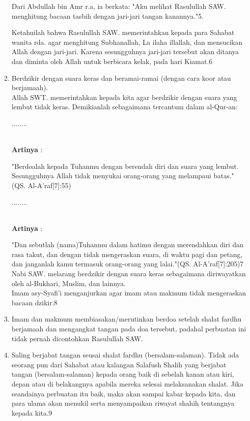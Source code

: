\documentclass[a4paper,12pt]{article}
\begin{document}
\begin{enumerate}
\par
\indent
Dari Abdullah bin Amr r.a, ia berkata: "Aku melihat Rasulullah SAW. menghitung bacaan tasbih dengan jari-jari tangan kanannya."5.\\
\par
\indent
Ketahuilah bahwa Rasulullah SAW. memerintahkan kepada para Sahabat wanita rda. agar menghitung Subhanallah, La ilaha illallah, dan mensucikan Allah dengan jari-jari. Karena sesungguhnya jari-jari tersebut akan ditanya dan diminta oleh Allah untuk berbicara kelak, pada hari Kiamat.6\\
\item Berdzikir dengan suara keras dan beramai-ramai (dengan cara koor atau berjamaah).\\
Allah SWT. memerintahkan kepada kita agar berdzikir dengan suara yang lembut tidak keras. Demikianlah sebagaimana tercantum dalam al-Qur-an:
\begin{arabtext}
\noindent
........ \\ \\
\end{arabtext}
\noindent
\textbf{Artinya} :
\par
\indent
"Berdoalah kepada Tuhanmu dengan berendah diri dan suara yang lembut. Sesungguhnya Allah tidak menyukai orang-orang yang melampaui batas."(QS. Al-A'raf[7]:55)\\
\begin{arabtext}
\noindent
........ \\ \\
\end{arabtext}
\noindent
\textbf{Artinya} :
\par
\indent
"Dan sebutlah (nama)Tuhanmu dalam hatimu dengan merendahkan diri dan rasa takut, dan dengan tidak mengeraskan suara, di waktu pagi dan petang, dan janganlah kamu termasuk orang-orang yang lalai."(QS. Al-A'raf[7]:205)7\\
\indent
Nabi SAW. melarang berdzikir dengan suara keras sebagaimana diriwayatkan oleh al-Bukhari, Muslim, dan lainnya.\\
\indent
Imam asy-Syafi'i menganjurkan agar imam atau makmum tidak mengeraskan bacaan dzikir.8\\
\item Imam dan makmum membiasakan/merutinkan berdoa setelah shalat fardhu berjamaah dan mengangkat tangan pada doa tersebut, padahal perbuatan ini tidak pernah dicontohkan Rasulullah SAW.
\item Saling berjabat tangan seusai shalat fardhu (bersalam-salaman). Tidak ada seorang pun dari Sahabat atau kalangan Salafush Shalih yang berjabat tangan (bersalam-salaman) kepada orang baik di sebelah kanan atau kiri, depan atau di belakangnya apabila mereka selesai melaksanakan shalat. Jika seandainya perbuatan itu baik, maka akan sampai kabar kepada kita, dan para ulama akan menukil serta menyampaikan riwayat shahih tentangnya kepada kita.9\\

\end{enumerate}
\end{document}
